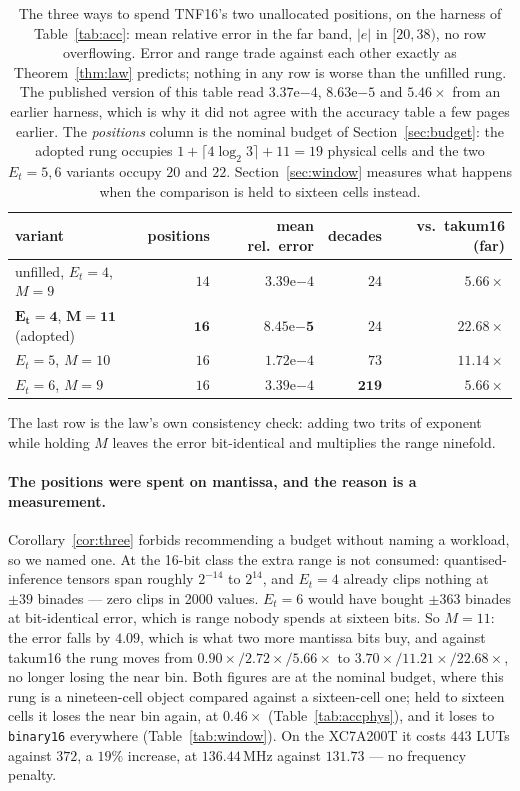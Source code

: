 \documentclass[11pt]{article}
\theoremstyle{definition}
\begin{document}
\begin{table}[t]\centering
\caption{The three ways to spend TNF16's two unallocated positions, on the
harness of Table~\ref{tab:acc}: mean relative error in the far band, $|e|$ in
$[20,38)$, no row overflowing. Error and range trade against each other exactly
as Theorem~\ref{thm:law} predicts; nothing in any row is worse than the unfilled
rung. The published version of this table read $3.37\mathrm{e}{-4}$,
$8.63\mathrm{e}{-5}$ and $5.46\times$ from an earlier harness, which is why it did
not agree with the accuracy table a few pages earlier. The \emph{positions} column
is the nominal budget of Section~\ref{sec:budget}: the adopted rung occupies
$1+\lceil 4\log_2 3\rceil+11=19$ physical cells and the two $E_t{=}5,6$ variants
occupy $20$ and $22$. Section~\ref{sec:window} measures what happens when the
comparison is held to sixteen cells instead.}
\label{tab:tnf16-fill}
\begin{tabular}{lrrrr}
\toprule
variant & positions & mean rel.\ error & decades & vs.\ takum16 (far) \\
\midrule
unfilled, $E_t{=}4$, $M{=}9$  & $14$ & $3.39\mathrm{e}{-4}$ & $24$  & $5.66\times$ \\
$\mathbf{E_t{=}4}$, $\mathbf{M{=}11}$ (adopted) & $\mathbf{16}$ & $\mathbf{8.45\mathrm{e}{-5}}$ & $24$ & $\mathbf{22.68\times}$ \\
$E_t{=}5$, $M{=}10$           & $16$ & $1.72\mathrm{e}{-4}$ & $73$  & $11.14\times$ \\
$E_t{=}6$, $M{=}9$            & $16$ & $3.39\mathrm{e}{-4}$ & $\mathbf{219}$ & $5.66\times$ \\
\bottomrule
\end{tabular}
\end{table}

The last row is the law's own consistency check: adding two trits of exponent
while holding $M$ leaves the error bit-identical and multiplies the range
ninefold.

\paragraph{The positions were spent on mantissa, and the reason is a measurement.}
Corollary~\ref{cor:three} forbids recommending a budget without naming a workload,
so we named one. At the 16-bit class the extra range is not consumed:
quantised-inference tensors span roughly $2^{-14}$ to $2^{14}$, and $E_t = 4$
already clips nothing at $\pm 39$ binades --- zero clips in 2000 values. $E_t = 6$
would have bought $\pm 363$ binades at bit-identical error, which is range nobody
spends at sixteen bits. So $M = 11$: the error falls by $4.09$, which is what two
more mantissa bits buy, and against takum16 the rung moves from
$0.90\times / 2.72\times / 5.66\times$ to $3.70\times / 11.21\times / 22.68\times$,
no longer losing the near bin. Both figures are at the nominal budget, where this
rung is a nineteen-cell object compared against a sixteen-cell one; held to
sixteen cells it loses the near bin again, at $0.46\times$
(Table~\ref{tab:accphys}), and it loses to \texttt{binary16} everywhere
(Table~\ref{tab:window}). On the XC7A200T it costs $443$ LUTs against $372$,
a $19\%$ increase, at $136.44$\,MHz against $131.73$ --- no frequency penalty.
\end{document}
